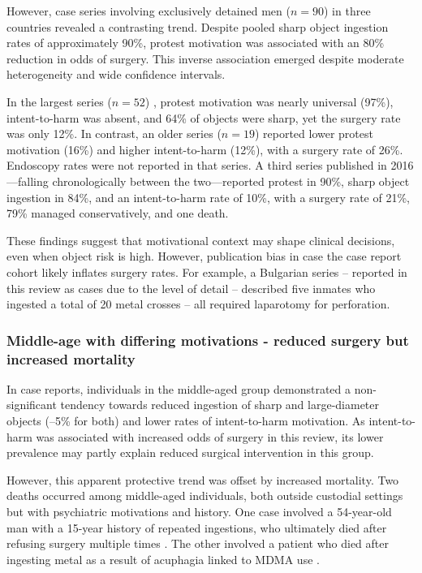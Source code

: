 \documentclass[pdflatex,sn-basic,Numbered]{sn-jnl}
\begin{document}
However, case series involving exclusively detained men ($n = 90$) in three countries revealed a contrasting trend. Despite pooled sharp object ingestion rates of approximately 90\%, protest motivation was associated with an 80\% reduction in odds of surgery. This inverse association emerged despite moderate heterogeneity and wide confidence intervals.

In the largest series ($n = 52$) \cite{Lee_2007}, protest motivation was nearly universal (97\%), intent-to-harm was absent, and 64\% of objects were sharp, yet the surgery rate was only 12\%. In contrast, an older series ($n = 19$) \cite{Karp_1991b} reported lower protest motivation (16\%) and higher intent-to-harm (12\%), with a surgery rate of 26\%. Endoscopy rates were not reported in that series. A third series published in 2016 \cite{Elghali_2016}—falling chronologically between the two—reported protest in 90\%, sharp object ingestion in 84\%, and an intent-to-harm rate of 10\%, with a surgery rate of 21\%, 79\% managed conservatively, and one death.

These findings suggest that motivational context may shape clinical decisions, even when object risk is high. However, publication bias in case the case report cohort likely inflates surgery rates. For example, a Bulgarian series \cite{Losanoff_1996, Losanoff_1997e} -- reported in this review as cases due to the level of detail -- described five inmates who ingested a total of 20 metal crosses -- all required laparotomy for perforation.

\subsubsection{Middle-age with differing motivations - reduced surgery but increased mortality}
In case reports, individuals in the middle-aged group demonstrated a non-significant tendency towards reduced ingestion of sharp and large-diameter objects (–5\% for both) and lower rates of intent-to-harm motivation. As intent-to-harm was associated with increased odds of surgery in this review, its lower prevalence may partly explain reduced surgical intervention in this group.

However, this apparent protective trend was offset by increased mortality. Two deaths occurred among middle-aged individuals, both outside custodial settings but with psychiatric motivations and history. One case involved a 54-year-old man with a 15-year history of repeated ingestions, who ultimately died after refusing surgery multiple times \cite{Kumar_2001}. The other involved a patient who died after ingesting metal as a result of acuphagia linked to MDMA use \cite{Emamhadi_2018}.
\end{document}
